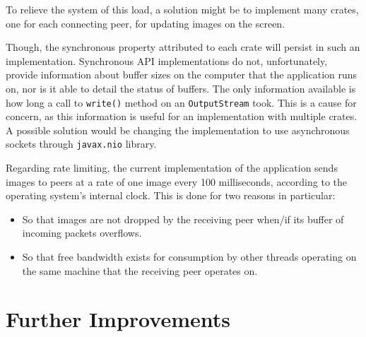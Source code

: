 \documentclass[10pt, a4paper]{article}
\begin{document}
To relieve the system of this load, a solution might be to implement many crates, one for each connecting peer, for updating images on the screen.

Though, the synchronous property attributed to each crate will persist in such an implementation.
Synchronous API implementations do not, unfortunately, provide information about buffer sizes on the computer that the application runs on, nor is it able to detail the status of buffers.
The only information available is how long a call to \verb|write()| method on an \verb|OutputStream| took.
This is a cause for concern, as this information is useful for an implementation with multiple crates.
A possible solution would be changing the implementation to use asynchronous sockets through \verb|javax.nio| library.  

Regarding rate limiting, the current implementation of the application sends images to peers at a rate of one image every 100 milliseconds, according to the operating system's internal clock.
This is done for two reasons in particular:

\begin{itemize}
	\item So that images are not dropped by the receiving peer when/if its buffer of incoming packets overflows.
	\item So that free bandwidth exists for consumption by other threads operating on the same machine that the receiving peer operates on.
\end{itemize}

\section{Further Improvements}
\end{document}
